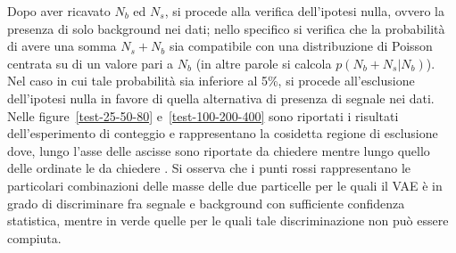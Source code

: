 Dopo aver ricavato $N_b$ ed $N_s$, si procede alla verifica dell'ipotesi nulla, ovvero la presenza di solo background nei dati; nello specifico si verifica che la probabilità di avere una somma $N_s + N_b$ sia compatibile con una distribuzione di Poisson centrata su di un valore pari a $N_b$ (in altre parole si calcola $p(N_b + N_s | N_b)$). Nel caso in cui tale probabilità sia inferiore al 5\%, si procede all'esclusione dell'ipotesi nulla in favore di quella alternativa di presenza di segnale nei dati.\\
Nelle figure~\ref{test-25-50-80} e~\ref{test-100-200-400} sono riportati i risultati dell'esperimento di conteggio e rappresentano la cosidetta  regione di esclusione dove, lungo l'asse delle ascisse sono riportate \color{red} da chiedere \color{black} mentre lungo quello delle ordinate le \color{red} da chiedere \color{black}. Si osserva che i punti rossi rappresentano le particolari combinazioni delle masse delle due particelle per le quali il VAE è in grado di discriminare fra segnale e background con sufficiente confidenza statistica, mentre in verde quelle per le quali tale discriminazione non può essere compiuta.

\newpage

